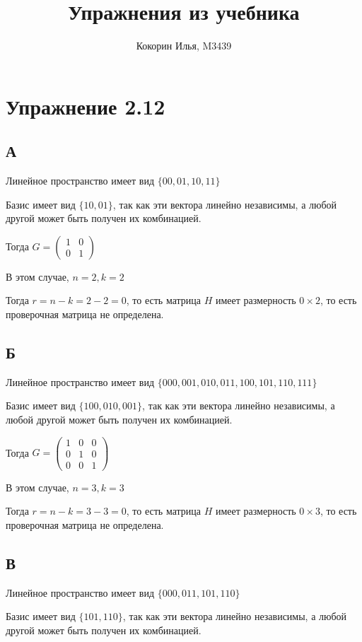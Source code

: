\documentclass{article}
\title{Упражнения из учебника}
\author{Кокорин Илья, M3439}
\begin{document}
	\maketitle
	\section{Упражнение 2.12}
	\subsection{А}
	Линейное пространство имеет вид $\{00,01,10,11\}$
	
	Базис имеет вид $\{10,01\}$, так как эти вектора линейно независимы, а любой другой может быть получен их комбинацией.
	
	Тогда $
	G = \left(
	\begin{array}{cccccccccc}
	1 & 0\\
	0 & 1
	\end{array}
	\right)
	$
	
	В этом случае, $n = 2, k = 2$
	
	Тогда $r = n - k = 2 - 2 = 0$, то есть матрица $H$ имеет размерность $0 \times 2$, то есть проверочная матрица не определена.
	
	\subsection{Б}
	Линейное пространство имеет вид $\{000,001,010,011,100,101,110,111\}$
	
	Базис имеет вид $\{100, 010, 001\}$, так как эти вектора линейно независимы, а любой другой может быть получен их комбинацией.
	
	Тогда $
	G = \left(
	\begin{array}{cccccccccc}
	1 & 0 & 0\\
	0 & 1 & 0\\
	0 & 0 & 1
	\end{array}
	\right)
	$
	
	В этом случае, $n = 3, k = 3$
	
	Тогда $r = n - k = 3 - 3 = 0$, то есть матрица $H$ имеет размерность $0 \times 3$, то есть проверочная матрица не определена.
	
	\subsection{В}
	Линейное пространство имеет вид $\{000,011,101,110\}$
	
	Базис имеет вид $\{101, 110\}$, так как эти вектора линейно независимы, а любой другой может быть получен их комбинацией.
	
\end{document}
